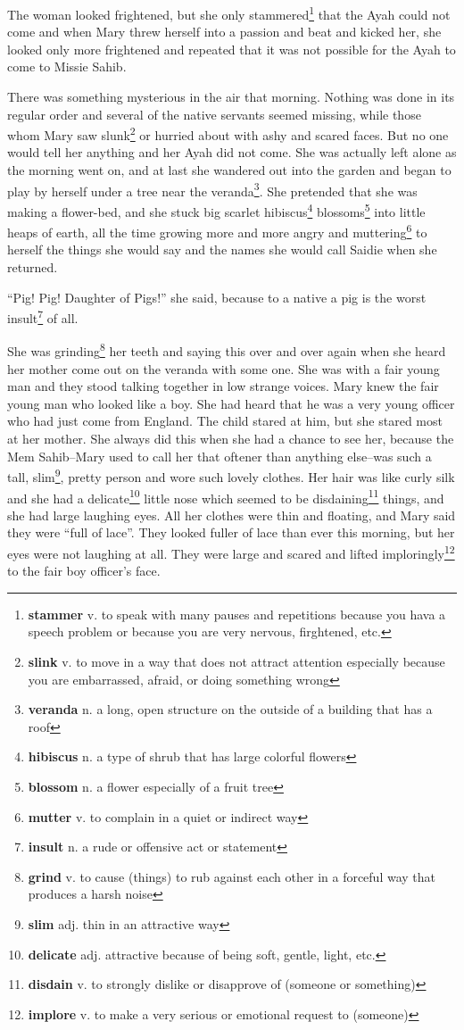 The woman looked frightened, but she only stammered\footnote{\textbf{stammer} v. to speak with many pauses and repetitions because you hava a speech problem or because you are very nervous, firghtened, etc.} that the Ayah could not come and when Mary threw herself into a passion and beat and kicked her, she looked only more frightened and repeated that it was not possible for the Ayah to come to Missie Sahib.

There was something mysterious in the air that morning. Nothing was done in its regular order and several of the native servants seemed missing, while those whom Mary saw slunk\footnote{\textbf{slink} v. to move in a way that does not attract attention especially because you are embarrassed, afraid, or doing something wrong} or hurried about with ashy and scared faces. But no one would tell her anything and her Ayah did not come. She was actually left alone as the morning went on, and at last she wandered out into the garden and began to play by herself under a tree near the veranda\footnote{\textbf{veranda} n. a long, open structure on the outside of a building that has a roof}. She pretended that she was making a flower-bed, and she stuck big scarlet hibiscus\footnote{\textbf{hibiscus} n. a type of shrub that has large colorful flowers} blossoms\footnote{\textbf{blossom} n. a flower especially of a fruit tree} into little heaps of earth, all the time growing more and more angry and muttering\footnote{\textbf{mutter} v. to complain in a quiet or indirect way} to herself the things she would say and the names she would call Saidie when she returned.

``Pig! Pig! Daughter of Pigs!'' she said, because to a native a pig is the worst insult\footnote{\textbf{insult} n. a rude or offensive act or statement} of all.

She was grinding\footnote{\textbf{grind} v. to cause (things) to rub against each other in a forceful way that produces a harsh noise} her teeth and saying this over and over again when she heard her mother come out on the veranda with some one. She was with a fair young man and they stood talking together in low strange voices. Mary knew the fair young man who looked like a boy. She had heard that he was a very young officer who had just come from England. The child stared at him, but she stared most at her mother. She always did this when she had a chance to see her, because the Mem Sahib--Mary used to call her that oftener than anything else--was such a tall, slim\footnote{\textbf{slim} adj. thin in an attractive way}, pretty person and wore such lovely clothes. Her hair was like curly silk and she had a delicate\footnote{\textbf{delicate} adj. attractive because of being soft, gentle, light, etc.} little nose which seemed to be disdaining\footnote{\textbf{disdain} v. to strongly dislike or disapprove of (someone or something)} things, and she had large laughing eyes. All her clothes were thin and floating, and Mary said they were ``full of lace''. They looked fuller of lace than ever this morning, but her eyes were not laughing at all. They were large and scared and lifted imploringly\footnote{\textbf{implore} v. to make a very serious or emotional request to (someone)} to the fair boy officer's face.

